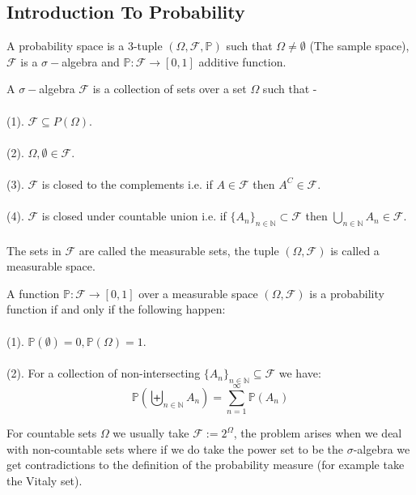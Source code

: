 \documentclass[../main.tex]{subfiles}
\begin{document}
\subsection{Introduction To Probability}
\begin{definition}
A probability space is a 3-tuple $(\Omega,\mathcal{F},\mathbb{P})$ such that $\Omega\neq\emptyset$ (The sample space), $\mathcal{F}$ is a $\sigma-$algebra and $\mathbb{P}:\mathcal{F}\rightarrow [0,1]$ additive function. 
\end{definition}
\begin{definition} A $\sigma-$algebra $\mathcal{F}$ is a collection of sets over a set $\Omega$ such that - \\\\
(1). $\mathcal{F}\subseteq P(\Omega)$. \\\\
(2). $\Omega,\emptyset\in\mathcal{F}$. \\\\
(3). $\mathcal{F}$ is closed to the complements i.e. if $A\in\mathcal{F}$ then $A^C\in\mathcal{F}$. \\\\
(4). $\mathcal{F}$ is closed under countable union i.e. if $\{A_n\}_{n\in\mathbb{N}}\subset\mathcal{F}$ then $\bigcup_{n\in\mathbb{N}} A_n\in\mathcal{F}$. \\\\
The sets in $\mathcal{F}$ are called the measurable sets, the tuple $(\Omega,\mathcal{F})$ is called a measurable space. 
\end{definition}
\begin{definition} A function $\mathbb{P}:\mathcal{F}\rightarrow [0,1]$ over a measurable space $(\Omega,\mathcal{F})$ is a probability function if and only if the following happen: \\\\
(1). $\mathbb{P}(\emptyset) = 0,\mathbb{P}(\Omega) = 1$. \\\\
(2). For a collection of non-intersecting $\{A_n\}_{n\in\mathbb{N}}\subseteq \mathcal{F}$ we have:
\[\mathbb{P}(\biguplus_{n\in\mathbb{N}} A_n) = \sum_{n=1}^\infty \mathbb{P}(A_n)\]
\end{definition}
For countable sets $\Omega$ we usually take $\mathcal{F}:=2^{\Omega}$, the problem arises when we deal with non-countable sets where if we do take the power set to be the $\sigma$-algebra we get contradictions to the definition of the probability measure (for example take the Vitaly set). \\\\
\end{document}
